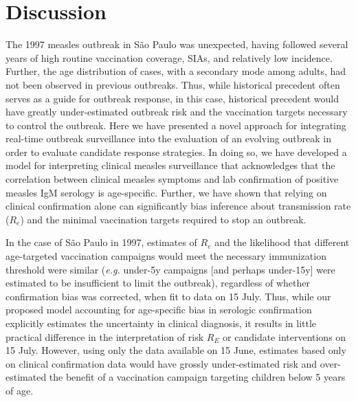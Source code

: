 \section{Discussion}\label{discussion}

The 1997 measles outbreak in S\~{a}o Paulo was unexpected, having followed several years of high routine vaccination coverage, SIAs, and relatively low incidence. Further, the age distribution of cases, with a secondary mode among adults, had not been observed in previous outbreaks. Thus, while historical precedent often serves as a guide for outbreak response, in this case, historical precedent would have greatly under-estimated outbreak risk and the vaccination targets necessary to control the outbreak. Here we have presented a novel approach for integrating real-time outbreak surveillance into the evaluation of an evolving outbreak in order to evaluate candidate response strategies. In doing so, we have developed a model for interpreting clinical measles surveillance that acknowledges that the correlation between clinical measles symptoms and lab confirmation of positive measles IgM serology is age-specific. Further, we have shown that relying on clinical confirmation alone can significantly bias inference about transmission rate ($R_e$) and the minimal vaccination targets required to stop an outbreak.

In the case of S\~{a}o Paulo in 1997, estimates of $R_e$ and the likelihood that different age-targeted vaccination campaigns would meet the necessary immunization threshold were similar (\emph{e.g.} under-5y campaigns [and perhaps under-15y] were estimated to be insufficient to limit the outbreak), regardless of whether confirmation bias was corrected, when fit to data on 15 July. Thus, while our proposed model accounting for age-specific bias in serologic confirmation explicitly estimates the uncertainty in clinical diagnosis, it results in little practical difference in the interpretation of risk \(R_E\) or candidate interventions on 15 July. However, using only the data available on 15 June, estimates based only on clinical confirmation data would have grossly under-estimated risk and over-estimated the benefit of a vaccination campaign targeting children below 5 years of age. 

